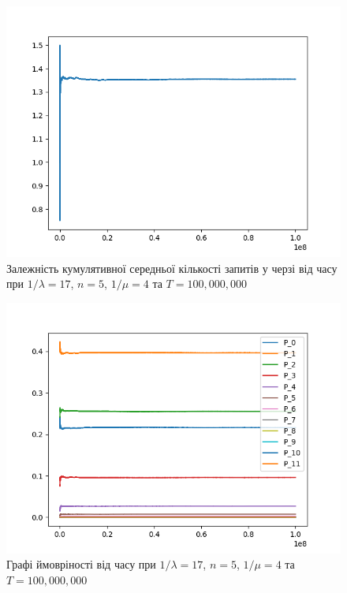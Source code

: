 \documentclass[14pt]{extarticle}
\begin{document}
\begin{figure}
  \centering
  \includegraphics{1_000_000_seconds-queue_length_mean.png}\caption{{Залежність
      кумулятивної середньої кількості запитів у черзі від часу при
      \(1/\lambda = 17\), \(n = 5\), \(1/\mu = 4\) та
      \(T = 100,000,000\)}}\label{img:exp-queue-length-mean-1-000-000}
\end{figure}


\begin{figure}
  \centering \includegraphics{1_000_000_seconds-p_n.png}\caption{{Графі
      ймовріності від часу при \(1/\lambda = 17\), \(n = 5\), \(1/\mu = 4\) та
      \(T = 100,000,000\)}}\label{img:exp-p-n-1-000-000}
\end{figure}
\end{document}
